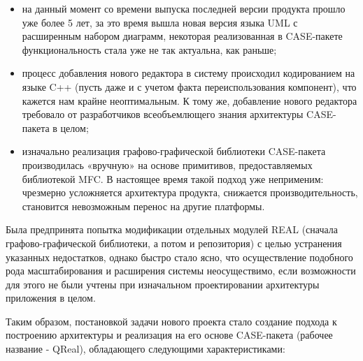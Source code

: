 \documentclass[a4paper]{article}
\newcommand\liststyleWWviiiNumxvii{%
\renewcommand\theenumi{\arabic{enumi}}
\renewcommand\theenumii{\arabic{enumii}}
\renewcommand\theenumiii{\arabic{enumiii}}
\renewcommand\labelitemi{[F0B7?]}
\renewcommand\labelenumi{\theenumi.}
\renewcommand\labelenumii{\theenumii.}
\renewcommand\labelenumiii{\theenumiii.}
}
\begin{document}
\liststyleWWviiiNumxvii
\begin{itemize}
\item {
на данный момент со времени выпуска последней версии продукта прошло уже
более 5 лет, за это время вышла новая версия языка
\foreignlanguage{english}{UML} с расширенным набором диаграмм,
некоторая реализованная в \foreignlanguage{english}{CASE}{}-пакете
функциональность стала уже не так актуальна, как раньше;}
\item {
процесс добавления нового редактора в систему происходил кодированием на
языке \foreignlanguage{english}{C}++ (пусть даже и с учетом факта
переиспользования компонент), что кажется нам крайне неоптимальным. К
тому же, добавление нового редактора требовало от разработчиков
всеобъемлющего знания архитектуры
\foreignlanguage{english}{CASE}{}-пакета в целом;}
\item {
изначально реализация графово-графической библиотеки
\foreignlanguage{english}{CASE}{}-пакета производилась «вручную» на
основе примитивов, предоставляемых библиотекой
\foreignlanguage{english}{MFC}. В настоящее время такой подход уже
неприменим: чрезмерно усложняется архитектура продукта, снижается
производительность, становится невозможным перенос на другие
платформы.}
\end{itemize}
{
Была предпринята попытка модификации отдельных модулей
\foreignlanguage{english}{REAL} (сначала графово-графической
библиотеки, а потом и репозитория) с целью устранения указанных
недостатков, однако быстро стало ясно, что осуществление подобного рода
масштабирования и расширения системы неосуществимо, если возможности
для этого не были учтены при изначальном проектировании архитектуры
приложения в целом. }

{
Таким образом, постановкой задачи нового проекта стало создание подхода
к построению архитектуры и реализация на его основе
\foreignlanguage{english}{CASE}{}-пакета (рабочее название -
\foreignlanguage{english}{QReal}), обладающего следующими
характеристиками:}
\end{document}
